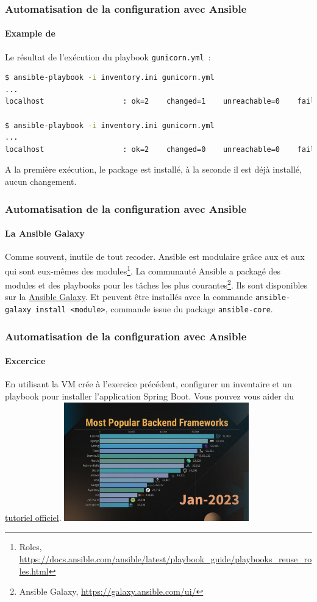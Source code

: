 \documentclass{beamer}
\begin{document}
    \begin{frame}[fragile]
        \transdissolve
        \frametitle{Automatisation de la configuration avec Ansible}
        \framesubtitle{Example de }
        Le résultat de l'exécution du playbook \lstinline{gunicorn.yml}~:
        \begin{lstlisting}[language=bash]
$ ansible-playbook -i inventory.ini gunicorn.yml
...
localhost                  : ok=2    changed=1    unreachable=0    failed=0    skipped=0    rescued=0    ignored=0

$ ansible-playbook -i inventory.ini gunicorn.yml
...
localhost                  : ok=2    changed=0    unreachable=0    failed=0    skipped=0    rescued=0    ignored=0
        \end{lstlisting}
        A la première exécution, le package est installé, à la seconde il est déjà installé, aucun changement.
    \end{frame}

    \begin{frame}
        \transdissolve
        \frametitle{Automatisation de la configuration avec Ansible}
        \framesubtitle{La Ansible Galaxy}
        Comme souvent, inutile de tout recoder.
        Ansible est modulaire grâce aux  et aux  qui sont eux-mêmes des modules\footnote{Roles, \url{https://docs.ansible.com/ansible/latest/playbook_guide/playbooks_reuse_roles.html}}.
        \bigbreak
        La communauté Ansible a packagé des modules et des playbooks pour les tâches les plus courantes\footnote{Ansible Galaxy, \url{https://galaxy.ansible.com/ui/}}.
        Ils sont disponibles sur la \href{https://galaxy.ansible.com/}{Ansible Galaxy}.
        Et peuvent être installés avec la commande \lstinline{ansible-galaxy install <module>}, commande issue du package \lstinline{ansible-core}.
    \end{frame}

    \begin{frame}
        \transdissolve
        \frametitle{Automatisation de la configuration avec Ansible}
        \framesubtitle{Excercice}
        En utilisant la VM crée à l'exercice précédent, configurer un inventaire et un playbook pour installer l'application Spring Boot.
        \bigbreak
        Vous pouvez vous aider du \href{https://spring.io/guides/gs/spring-boot}{tutoriel officiel}.
        \bigbreak
        \centering
        \includegraphics[width=8cm]{image/most-popular-backend.jpg}
    \end{frame}
\end{document}
